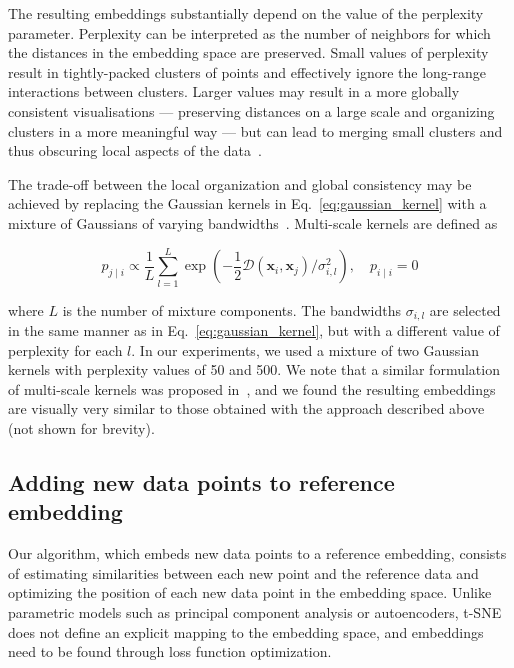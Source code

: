 \documentclass[runningheads]{llncs}
\begin{document}
The resulting embeddings substantially depend on the value of the perplexity
parameter. Perplexity can be interpreted as the number of neighbors for which
the distances in the embedding space are preserved. Small values of perplexity
result in tightly-packed clusters of points and effectively ignore the
long-range interactions between clusters. Larger values may result in a more
globally consistent visualisations --- preserving distances on a large scale
and organizing clusters in a more meaningful way --- but can lead to merging
small clusters and thus obscuring local aspects of the
data~\cite{art_of_using_tsne}.

The trade-off between the local organization and global consistency may be
achieved by replacing the Gaussian kernels in Eq.~\ref{eq:gaussian_kernel} with
a mixture of Gaussians of varying bandwidths~\cite{multiscale_tsne}.
Multi-scale kernels are defined as

\begin{equation}
p_{j \mid i} \propto \frac{1}{L} \sum_{l=1}^{L} \exp \left ( - \frac{1}{2} \mathcal{D}(\mathbf{x}_i, \mathbf{x}_j ) / \sigma_{i,l}^2 \right ), \quad p_{i \mid i} = 0
\label{eq:multiscale}
\end{equation}

\noindent where $L$ is the number of mixture components. The bandwidths
$\sigma_{i,l}$ are selected in the same manner as in
Eq.~\ref{eq:gaussian_kernel}, but with a different value of perplexity for each
$l$. In our experiments, we used a mixture of two Gaussian kernels with
perplexity values of 50 and 500. We note that a similar formulation of
multi-scale kernels was proposed in~\cite{art_of_using_tsne}, and we found the
resulting embeddings are visually very similar to those obtained with the
approach described above (not shown for brevity).


\subsection{Adding new data points to reference embedding\label{sec:transfer}}

Our algorithm, which embeds new data points to a reference embedding, consists
of estimating similarities between each new point and the reference data and
optimizing the position of each new data point in the embedding space. Unlike
parametric models such as principal component analysis or autoencoders, t-SNE
does not define an explicit mapping to the embedding space, and embeddings need
to be found through loss function optimization.
\end{document}
